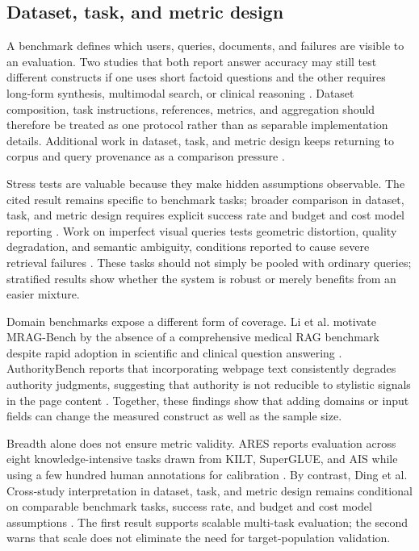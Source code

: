 \documentclass[a4paper,11pt]{article}
\begin{document}
\subsection{Dataset, task, and metric design}


A benchmark defines which users, queries, documents, and failures are visible to an evaluation. Two studies that both report answer accuracy may still test different constructs if one uses short factoid questions and the other requires long-form synthesis, multimodal search, or clinical reasoning \citep{Upadhyay2026Overview,Zhang2026Before,Li2026Mrag}. Dataset composition, task instructions, references, metrics, and aggregation should therefore be treated as one protocol rather than as separable implementation details. Additional work in dataset, task, and metric design keeps returning to corpus and query provenance as a comparison pressure \citep{Packowski2024Optimizing}.

Stress tests are valuable because they make hidden assumptions observable. The cited result remains specific to benchmark tasks; broader comparison in dataset, task, and metric design requires explicit success rate and budget and cost model reporting \citep{Upadhyay2026Overview}. Work on imperfect visual queries tests geometric distortion, quality degradation, and semantic ambiguity, conditions reported to cause severe retrieval failures \citep{Zhang2026Before}. These tasks should not simply be pooled with ordinary queries; stratified results show whether the system is robust or merely benefits from an easier mixture.

Domain benchmarks expose a different form of coverage. Li et al. motivate MRAG-Bench by the absence of a comprehensive medical RAG benchmark despite rapid adoption in scientific and clinical question answering \citep{Li2026Mrag}. AuthorityBench reports that incorporating webpage text consistently degrades authority judgments, suggesting that authority is not reducible to stylistic signals in the page content \citep{Yao2026Authoritybench}. Together, these findings show that adding domains or input fields can change the measured construct as well as the sample size.

Breadth alone does not ensure metric validity. ARES reports evaluation across eight knowledge-intensive tasks drawn from KILT, SuperGLUE, and AIS while using a few hundred human annotations for calibration \citep{SaadFalcon2023Ares}. By contrast, Ding et al. Cross-study interpretation in dataset, task, and metric design remains conditional on comparable benchmark tasks, success rate, and budget and cost model assumptions \citep{Ding2026Attribution}. The first result supports scalable multi-task evaluation; the second warns that scale does not eliminate the need for target-population validation.
\end{document}
